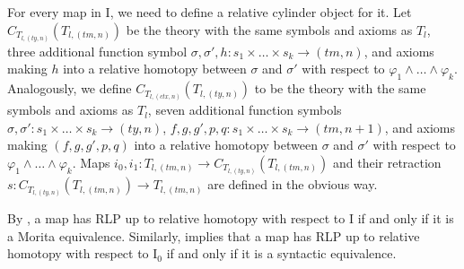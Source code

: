 \documentclass[reqno]{amsart}
\theoremstyle{definition}
\theoremstyle{remark}
\newcommand{\ty}{\mathit{ty}}
\newcommand{\ctx}{\mathit{ctx}}
\newcommand{\tm}{\mathit{tm}}
\newcommand{\I}{\mathrm{I}}
\newcommand{\cyli}{i}
\numberwithin{figure}{section}
\begin{document}
For every map in $\I$, we need to define a relative cylinder object for it.
Let $C_{T_{l,(\ty,n)}}(T_{l,(\tm,n)})$ be the theory with the same symbols and axioms as $T_l$,
three additional function symbol $\sigma, \sigma', h : s_1 \times \ldots \times s_k \to (\tm,n)$,
and axioms making $h$ into a relative homotopy between $\sigma$ and $\sigma'$ with respect to $\varphi_1 \land \ldots \land \varphi_k$.
Analogously, we define $C_{T_{l,(\ctx,n)}}(T_{l,(\ty,n)})$ to be the theory with the same symbols and axioms as $T_l$,
seven additional function symbols $\sigma,\sigma' : s_1 \times \ldots \times s_k \to (\ty,n)$, $f,g,g',p,q : s_1 \times \ldots \times s_k \to (\tm,n+1)$,
and axioms making $(f,g,g',p,q)$ into a relative homotopy between $\sigma$ and $\sigma'$ with respect to $\varphi_1 \land \ldots \land \varphi_k$.
Maps $\cyli_0,\cyli_1 : T_{l,(\tm,n)} \to C_{T_{l,(\ty,n)}}(T_{l,(\tm,n)})$ and their retraction
$s : C_{T_{l,(\ty,n)}}(T_{l,(\tm,n)}) \to T_{l,(\tm,n)}$ are defined in the obvious way.

\begin{remark}
By , a map has RLP up to relative homotopy with respect to $\I$ if and only if it is a Morita equivalence.
Similarly,  implies that a map has RLP up to relative homotopy with respect to $\I_0$ if and only if it is a syntactic equivalence.
\end{remark}
\end{document}
